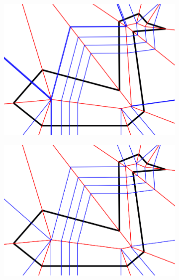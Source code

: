\documentclass[11pt]{article}
\begin{document}
\begin{figure}[H]
\begin{subfigure}[b]{0.18\textwidth}
    \includegraphics[width=\textwidth]{FIGS/Part4/c12}
     \caption{}
     \label{fig:c12}
  \end{subfigure}
      \begin{subfigure}[b]{0.18\textwidth}
    \includegraphics[width=\textwidth]{FIGS/Part4/c13}
     \caption{}
     \label{fig:c13}
  \end{subfigure}
      \begin{subfigure}[b]{0.18\textwidth}

\end{subfigure}
\end{figure}
\end{document}
